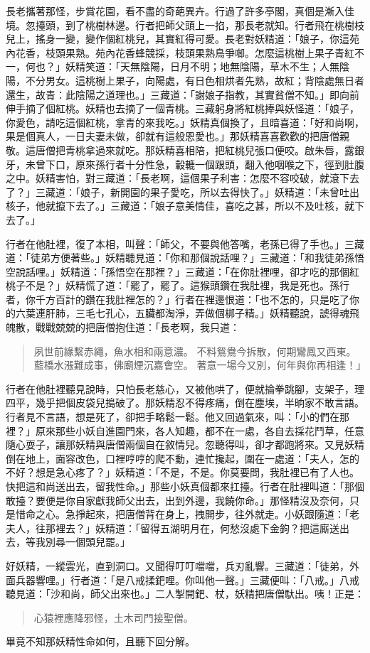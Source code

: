 長老攜著那怪，步賞花園，看不盡的奇葩異卉。行過了許多亭閣，真個是漸入佳境。忽擡頭，到了桃樹林邊。行者把師父頭上一掐，那長老就知。行者飛在桃樹枝兒上，搖身一變，變作個紅桃兒，其實紅得可愛。長老對妖精道：「娘子，你這苑內花香，枝頭果熟。苑內花香蜂競採，枝頭果熟鳥爭啣。怎麼這桃樹上果子青紅不一，何也？」妖精笑道：「天無陰陽，日月不明；地無陰陽，草木不生；人無陰陽，不分男女。這桃樹上果子，向陽處，有日色相烘者先熟，故紅；背陰處無日者還生，故青：此陰陽之道理也。」三藏道：「謝娘子指教，其實貧僧不知。」即向前伸手摘了個紅桃。妖精也去摘了一個青桃。三藏躬身將紅桃捧與妖怪道：「娘子，你愛色，請吃這個紅桃，拿青的來我吃。」妖精真個換了，且暗喜道：「好和尚啊，果是個真人，一日夫妻未做，卻就有這般恩愛也。」那妖精喜喜歡歡的把唐僧親敬。這唐僧把青桃拿過來就吃。那妖精喜相陪，把紅桃兒張口便咬。啟朱唇，露銀牙，未曾下口，原來孫行者十分性急，轂轆一個跟頭，翻入他咽喉之下，徑到肚腹之中。妖精害怕，對三藏道：「長老啊，這個果子利害：怎麼不容咬破，就滾下去了？」三藏道：「娘子，新開園的果子愛吃，所以去得快了。」妖精道：「未曾吐出核子，他就攛下去了。」三藏道：「娘子意美情佳，喜吃之甚，所以不及吐核，就下去了。」

行者在他肚裡，復了本相，叫聲：「師父，不要與他答嘴，老孫已得了手也。」三藏道：「徒弟方便著些。」妖精聽見道：「你和那個說話哩？」三藏道：「和我徒弟孫悟空說話哩。」妖精道：「孫悟空在那裡？」三藏道：「在你肚裡哩，卻才吃的那個紅桃子不是？」妖精慌了道：「罷了，罷了。這猴頭鑽在我肚裡，我是死也。孫行者，你千方百計的鑽在我肚裡怎的？」行者在裡邊恨道：「也不怎的，只是吃了你的六葉連肝肺，三毛七孔心，五臟都淘淨，弄做個梆子精。」妖精聽說，諕得魂飛魄散，戰戰兢兢的把唐僧抱住道：「長老啊，我只道：
\begin{quote}
夙世前緣繫赤繩，魚水相和兩意濃。
不料鴛鴦今拆散，何期鸞鳳又西東。
藍橋水漲難成事，佛廟煙沉嘉會空。
著意一場今又別，何年與你再相逢！」
\end{quote}

行者在他肚裡聽見說時，只怕長老慈心，又被他哄了，便就掄拳跳腳，支架子，理四平，幾乎把個皮袋兒搗破了。那妖精忍不得疼痛，倒在塵埃，半晌家不敢言語。行者見不言語，想是死了，卻把手略鬆一鬆。他又回過氣來，叫：「小的們在那裡？」原來那些小妖自進園門來，各人知趣，都不在一處，各自去採花鬥草，任意隨心耍子，讓那妖精與唐僧兩個自在敘情兒。忽聽得叫，卻才都跑將來。又見妖精倒在地上，面容改色，口裡哼哼的爬不動，連忙攙起，圍在一處道：「夫人，怎的不好？想是急心疼了？」妖精道：「不是，不是。你莫要問，我肚裡已有了人也。快把這和尚送出去，留我性命。」那些小妖真個都來扛擡。行者在肚裡叫道：「那個敢擡？要便是你自家獻我師父出去，出到外邊，我饒你命。」那怪精沒及奈何，只是惜命之心。急掙起來，把唐僧背在身上，拽開步，往外就走。小妖跟隨道：「老夫人，往那裡去？」妖精道：「留得五湖明月在，何愁沒處下金鉤？把這廝送出去，等我別尋一個頭兒罷。」

好妖精，一縱雲光，直到洞口。又聞得叮叮噹噹，兵刃亂響。三藏道：「徒弟，外面兵器響哩。」行者道：「是八戒揉鈀哩。你叫他一聲。」三藏便叫：「八戒。」八戒聽見道：「沙和尚，師父出來也。」二人掣開鈀、杖，妖精把唐僧馱出。咦！正是：
\begin{quote}
心猿裡應降邪怪，土木司門接聖僧。
\end{quote}

畢竟不知那妖精性命如何，且聽下回分解。
